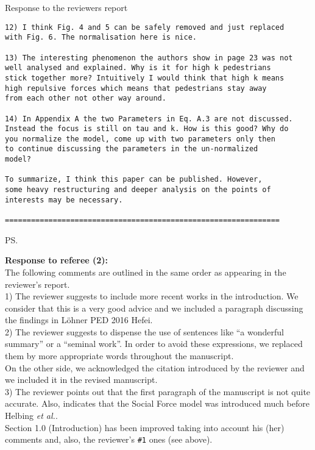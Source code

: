 \documentclass[a4paper,12pt]{letter}
\begin{document}
\begin{letter}{Response to the reviewers report}
\begin{verbatim}
12) I think Fig. 4 and 5 can be safely removed and just replaced 
with Fig. 6. The normalisation here is nice.

13) The interesting phenomenon the authors show in page 23 was not 
well analysed and explained. Why is it for high k pedestrians 
stick together more? Intuitively I would think that high k means 
high repulsive forces which means that pedestrians stay away 
from each other not other way around.

14) In Appendix A the two Parameters in Eq. A.3 are not discussed. 
Instead the focus is still on tau and k. How is this good? Why do 
you normalize the model, come up with two parameters only then 
to continue discussing the parameters in the un-normalized 
model?

To summarize, I think this paper can be published. However, 
some heavy restructuring and deeper analysis on the points of 
interests may be necessary. 

===============================================================

\end{verbatim}


\ps{\textbf{Response to referee (2):} \\

The following comments are outlined in the same order as appearing in the
reviewer’s report. \\

1) The reviewer suggests to include more recent works in the introduction. We consider that this
is a very good advice and we included a paragraph discussing the findings in L\"ohner PED 2016 Hefei. \\

2) The reviewer suggests to dispense the use of sentences like ``a wonderful 
summary'' or a ``seminal work''. In order to avoid these expressions, we 
replaced them by more appropriate words throughout the manuscript. \\

On the other side, we acknowledged the citation introduced by the reviewer and 
we included it in the revised manuscript. \\

3) The reviewer points out that the first paragraph of the manuscript is not 
quite accurate. Also, indicates that the Social Force model was introduced much 
before Helbing \textit{et al.}. \\

Section 1.0 (Introduction) has been improved taking into account his (her) 
comments and, also, the reviewer's \verb?#1? ones (see above). 

}
\end{letter}
\end{document}
